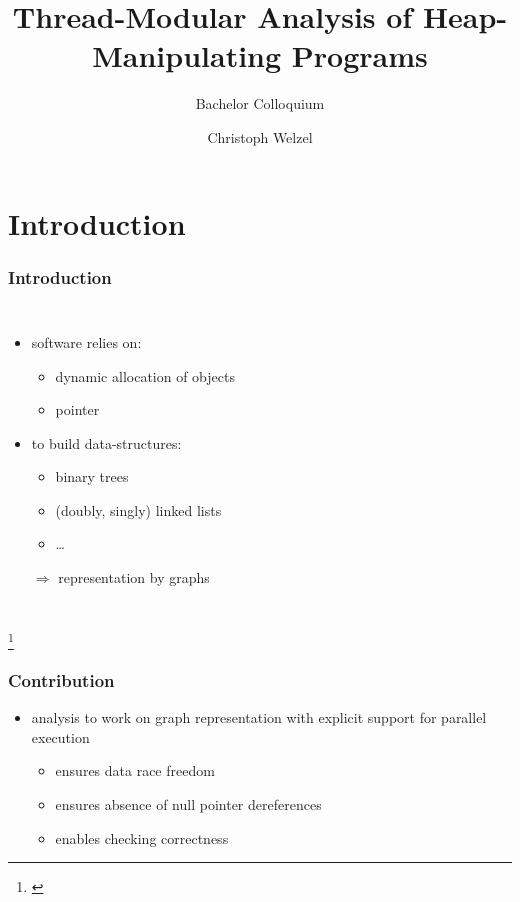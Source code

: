 \documentclass{beamer}
\title{Thread-Modular Analysis of Heap-Manipulating Programs}
\subtitle{Bachelor Colloquium}
\date{\DTMdisplaydate{2015}{8}{27}{-1}}
\author{Christoph Welzel}
\institute{Lehrstuhl für Informatik 2}
\newcommand\blfootnote[1]{%
	\begingroup
	\renewcommand\thefootnote{}\footnote{#1}%
	\addtocounter{footnote}{-1}%
	\endgroup
}
\begin{document}
\maketitle

\section{Introduction}
%
\begin{frame}
	\frametitle{Introduction}
	\begin{columns}
		\begin{itemize}
			\item software relies on:
				\begin{itemize}
					\item dynamic allocation of objects
					\item pointer
				\end{itemize}
			\item to build data-structures:
				\begin{itemize}
					\item binary trees
					\item (doubly, singly) linked lists
					\item \dots
				\end{itemize}
			\item[$\Rightarrow$] representation by graphs
		\end{itemize}
	\end{columns}
	\blfootnote{\cite{golang}}
\end{frame}

\begin{frame}
	\frametitle{Contribution}
	\begin{itemize}
		\item analysis to work on graph representation with explicit support for
			parallel execution
			\begin{itemize}
				\item \alert<2>{ensures data race freedom}
				\item \alert<3>{ensures absence of null pointer dereferences}
				\item \alert<4>{enables checking correctness}
			\end{itemize}
	\end{itemize}
\end{frame}
\end{document}
